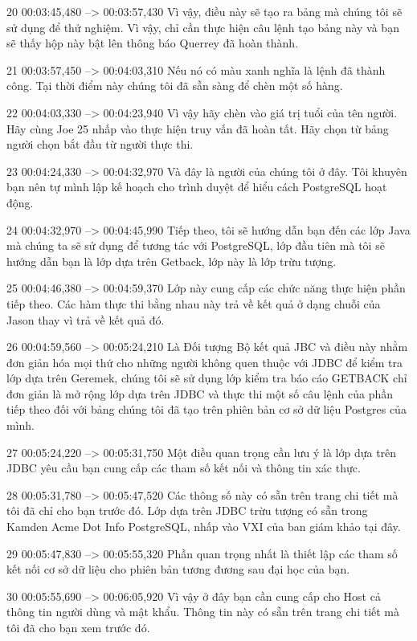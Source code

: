 20
00:03:45,480 --> 00:03:57,430
Vì vậy, điều này sẽ tạo ra bảng mà chúng tôi sẽ sử dụng để thử nghiệm.  Vì vậy, chỉ cần thực hiện câu lệnh tạo bảng này và bạn sẽ thấy hộp này bật lên thông báo Querrey đã hoàn thành.

21
00:03:57,450 --> 00:04:03,310
Nếu nó có màu xanh nghĩa là lệnh đã thành công.  Tại thời điểm này chúng tôi đã sẵn sàng để chèn một số hàng.

22
00:04:03,330 --> 00:04:23,940
Vì vậy hãy chèn vào giá trị tuổi của tên người.  Hãy cùng Joe 25 nhấp vào thực hiện truy vấn đã hoàn tất.  Hãy chọn từ bảng người chọn bắt đầu từ người thực thi.

23
00:04:24,330 --> 00:04:32,970
Và đây là người của chúng tôi ở đây.  Tôi khuyên bạn nên tự mình lập kế hoạch cho trình duyệt để hiểu cách PostgreSQL hoạt động.

24
00:04:32,970 --> 00:04:45,990
Tiếp theo, tôi sẽ hướng dẫn bạn đến các lớp Java mà chúng ta sẽ sử dụng để tương tác với PostgreSQL, lớp đầu tiên mà tôi sẽ hướng dẫn bạn là lớp dựa trên Getback, lớp này là lớp trừu tượng.

25
00:04:46,380 --> 00:04:59,370
Lớp này cung cấp các chức năng thực hiện phần tiếp theo.  Các hàm thực thi bằng nhau này trả về kết quả ở dạng chuỗi của Jason thay vì trả về kết quả đó.

26
00:04:59,560 --> 00:05:24,210
Là Đối tượng Bộ kết quả JBC và điều này nhằm đơn giản hóa mọi thứ cho những người không quen thuộc với JDBC để kiểm tra lớp dựa trên Geremek, chúng tôi sẽ sử dụng lớp kiểm tra báo cáo GETBACK chỉ đơn giản là mở rộng lớp dựa trên JDBC và thực thi một số câu lệnh của phần tiếp theo đối với bảng  chúng tôi đã tạo trên phiên bản cơ sở dữ liệu Postgres của mình.

27
00:05:24,220 --> 00:05:31,750
Một điều quan trọng cần lưu ý là lớp dựa trên JDBC yêu cầu bạn cung cấp các tham số kết nối và thông tin xác thực.

28
00:05:31,780 --> 00:05:47,520
Các thông số này có sẵn trên trang chi tiết mà tôi đã chỉ cho bạn trước đó.  Lớp dựa trên JDBC trừu tượng có sẵn trong Kamden Acme Dot Info PostgreSQL, nhấp vào VXI của ban giám khảo tại đây.

29
00:05:47,830 --> 00:05:55,320
Phần quan trọng nhất là thiết lập các tham số kết nối cơ sở dữ liệu cho phiên bản tương đương sau đại học của bạn.

30
00:05:55,690 --> 00:06:05,920
Vì vậy ở đây bạn cần cung cấp cho Host cả thông tin người dùng và mật khẩu.  Thông tin này có sẵn trên trang chi tiết mà tôi đã cho bạn xem trước đó.

